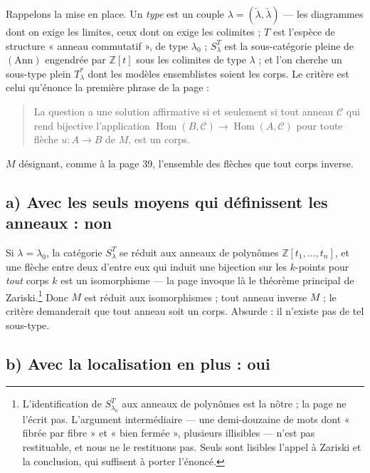 \documentclass[11pt,a4paper]{article}
\begin{document}
Rappelons la mise en place. Un \emph{type} est un couple
$\lambda = (\underleftarrow{\lambda}, \underrightarrow{\lambda})$ — les
diagrammes dont on exige les limites, ceux dont on exige les colimites ; $T$
est l'espèce de structure « anneau commutatif », de type $\lambda_{0}$ ;
$S^{T}_{\lambda}$ est la sous-catégorie pleine de $(\mathrm{Ann})$ engendrée par
$\mathbb{Z}[t]$ sous les colimites de type $\lambda$ ; et l'on cherche un
sous-type plein $T^{*}_{\lambda}$ dont les modèles ensemblistes soient les
corps. Le critère est celui qu'énonce la première phrase de la page :

\begin{quote}
La question a une solution affirmative si et seulement si tout anneau
$\mathcal{C}$ qui rend bijective l'application
$\operatorname{Hom}(B,\mathcal{C}) \to \operatorname{Hom}(A,\mathcal{C})$ pour
toute flèche $u : A \to B$ de $M$, est un corps.
\end{quote}

$M$ désignant, comme à la page 39, l'ensemble des flèches que tout corps
inverse.

\subsection*{a) Avec les seuls moyens qui définissent les anneaux : non}

Si $\lambda = \lambda_{0}$, la catégorie $S^{T}_{\lambda}$ se réduit aux
anneaux de polynômes $\mathbb{Z}[t_{1}, \ldots, t_{n}]$, et une flèche entre
deux d'entre eux qui induit une bijection sur les $k$-points pour \emph{tout}
corps $k$ est un isomorphisme — la page invoque là le théorème principal de
Zariski.\footnote{L'identification de $S^{T}_{\lambda_{0}}$ aux anneaux de
polynômes est la nôtre ; la page ne l'écrit pas. L'argument intermédiaire — une
demi-douzaine de mots dont « fibrée par fibre » et « bien fermée », plusieurs
illisibles — n'est pas restituable, et nous ne le restituons pas. Seuls sont
lisibles l'appel à Zariski et la conclusion, qui suffisent à porter l'énoncé.}
Donc $M$ est réduit aux isomorphismes ; tout anneau inverse $M$ ; le critère
demanderait que tout anneau soit un corps. Absurde : il n'existe pas de tel
sous-type.

\subsection*{b) Avec la localisation en plus : oui}
\end{document}
